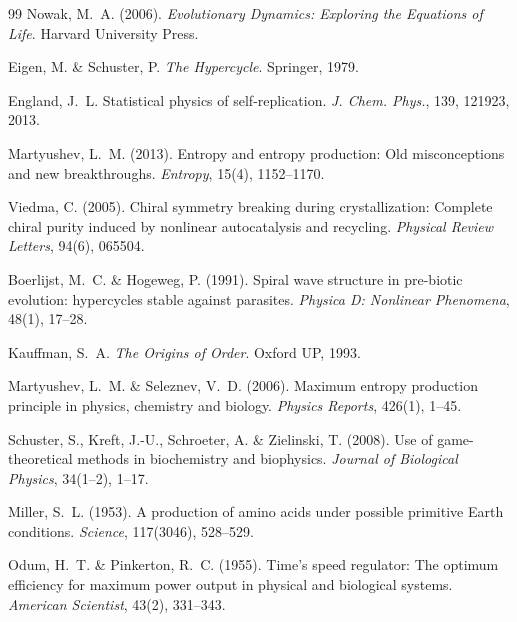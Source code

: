 \documentclass[12pt,a4paper]{article}
\theoremstyle{remark}
\begin{document}
\begin{thebibliography}{99}
Nowak, M.~A. (2006).
\newblock \textit{Evolutionary Dynamics: Exploring the Equations of Life}.
\newblock Harvard University Press.

Eigen, M. \& Schuster, P.
\newblock \textit{The Hypercycle}.
\newblock Springer, 1979.

England, J.~L.
\newblock Statistical physics of self-replication.
\newblock \textit{J. Chem. Phys.}, 139, 121923, 2013.

Martyushev, L.~M. (2013).
\newblock Entropy and entropy production: Old misconceptions and new breakthroughs.
\newblock \textit{Entropy}, 15(4), 1152--1170.


Viedma, C. (2005).
\newblock Chiral symmetry breaking during crystallization: Complete chiral purity induced by nonlinear autocatalysis and recycling.
\newblock \textit{Physical Review Letters}, 94(6), 065504.

Boerlijst, M.~C. \& Hogeweg, P. (1991).
\newblock Spiral wave structure in pre-biotic evolution: hypercycles stable against parasites.
\newblock \textit{Physica D: Nonlinear Phenomena}, 48(1), 17--28.

Kauffman, S.~A.
\newblock \textit{The Origins of Order}.
\newblock Oxford UP, 1993.

Martyushev, L.~M. \& Seleznev, V.~D. (2006).
\newblock Maximum entropy production principle in physics, chemistry and biology.
\newblock \textit{Physics Reports}, 426(1), 1--45.

Schuster, S., Kreft, J.-U., Schroeter, A. \& Zielinski, T. (2008).
\newblock Use of game-theoretical methods in biochemistry and biophysics.
\newblock \textit{Journal of Biological Physics}, 34(1--2), 1--17.

Miller, S.~L. (1953).
\newblock A production of amino acids under possible primitive Earth conditions.
\newblock \textit{Science}, 117(3046), 528--529.

Odum, H.~T. \& Pinkerton, R.~C. (1955).
\newblock Time's speed regulator: The optimum efficiency for maximum power output in physical and biological systems.
\newblock \textit{American Scientist}, 43(2), 331--343.


\end{thebibliography}
\end{document}
